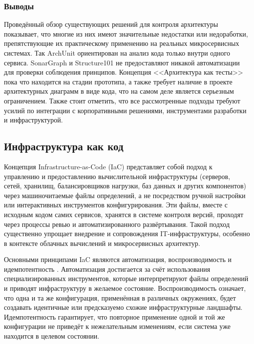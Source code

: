 \subsubsection{Выводы}

Проведённый обзор существующих решений для контроля архитектуры показывает, что многие из них имеют значительные недостатки или недоработки, препятствующие их практическому применению на реальных микросервисных системах. Так ArchUnit ориентирован на анализ кода только внутри одного сервиса. SonarGraph и Structure101 не предоставляют никакой автоматизации для проверки соблюдения принципов. Концепция <<Архитектура как тесты>> пока что находится на стадии прототипа, а также требует наличие в проекте архитектурных диаграмм в виде кода, что на самом деле является серьезным ограничением. Также стоит отметить, что все рассмотренные подходы требуют усилий по интеграции с корпоративными решениями, инструментами разработки и инфраструктурой.

\newpage

\subsection{Инфраструктура как код}

Концепция Infrastructure-as-Code (IaC) представляет собой подход к управлению и предоставлению вычислительной инфраструктуры (серверов, сетей, хранилищ, балансировщиков нагрузки, баз данных и других компонентов) через машиночитаемые файлы определений, а не посредством ручной настройки или интерактивных инструментов конфигурирования. Эти файлы, вместе с исходным кодом самих сервисов, хранятся в системе контроля версий, проходят через процессы ревью и автоматизированного развёртывания. Такой подход существенно упрощает внедрение и сопровождения IT-инфраструктуры, особенно в контексте облачных вычислений и микросервисных архитектур.

Основными принципами IaC являются автоматизация, воспроизводимость и идемпотентность \cite{iac-principles}. Автоматизация достигается за счёт использования специализированных инструментов, которые интерпретируют файлы определений и приводят инфраструктуру в желаемое состояние. Воспроизводимость означает, что одна и та же конфигурация, применённая в различных окружениях, будет создавать идентичные или предсказуемо схожие инфраструктурные ландшафты. Идемпотентность гарантирует, что повторное применение одной и той же конфигурации не приведёт к нежелательным изменениям, если система уже находится в целевом состоянии.

